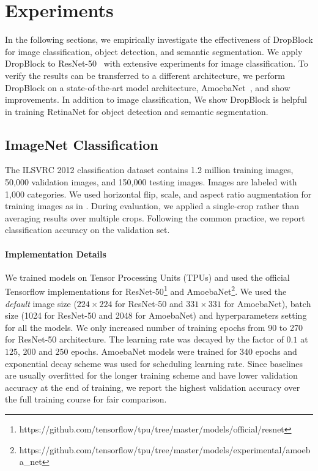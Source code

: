 \documentclass{article}
\begin{document}
\section{Experiments}
In the following sections, we empirically investigate the effectiveness of DropBlock for image classification, object detection, and semantic segmentation. We apply DropBlock to ResNet-50~\cite{he2016deep} with extensive experiments for image classification. To verify the results can be transferred to a different architecture, we perform DropBlock on a state-of-the-art model architecture, AmoebaNet~\cite{real2018regularized}, and show improvements. In addition to image classification, We show DropBlock is helpful in training RetinaNet \cite{lin2017focalloss} for object detection and semantic segmentation.

\subsection{ImageNet Classification}
The ILSVRC 2012 classification dataset \cite{imagenet2009}
contains 1.2 million training images, 50,000 validation images, and 150,000 testing images. Images are labeled with 1,000 categories.
We used horizontal flip, scale, and aspect ratio augmentation for training images as in \cite{szegedy2015going, huang2017densely}. During evaluation, we applied a single-crop rather than averaging results over multiple crops. Following the common practice, we report classification accuracy on the validation set. 

\paragraph{Implementation Details}
We trained models on Tensor Processing Units (TPUs) and used the official Tensorflow implementations for  ResNet-50\footnote{https://github.com/tensorflow/tpu/tree/master/models/official/resnet}
and AmoebaNet\footnote{https://github.com/tensorflow/tpu/tree/master/models/experimental/amoeba\_net}. We used the \textit{default} image size ($224\times224$ for ResNet-50 and $331\times331$ for AmoebaNet), batch size (1024 for ResNet-50 and 2048 for AmoebaNet) and hyperparameters setting for all the models. We only increased number of training epochs from 90 to 270 for ResNet-50 architecture. The learning rate was decayed by the factor of $0.1$ at $125$, $200$  and $250$ epochs.
AmoebaNet models were trained for 340 epochs and exponential decay scheme was used for scheduling learning rate.
Since baselines are usually overfitted for the longer training scheme and have lower
validation accuracy at the end of training, we report the
highest validation accuracy over the full training course for fair comparison.
\end{document}
